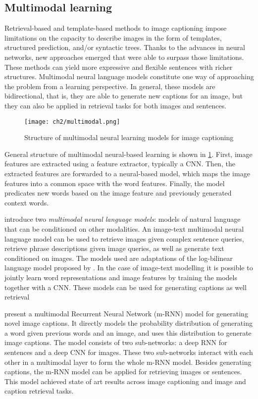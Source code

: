 \subsection{Multimodal learning}

Retrieval-based and template-based methods to image captioning impose limitations on the capacity to describe images in the form of templates, structured prediction, and/or syntactic trees. Thanks to the advances in neural networks, new approaches emerged that were able to surpass those limitations. These methods can yield more expressive and flexible sentences with richer structures.  Multimodal neural language models constitute one way of approaching the problem from a learning perspective. In general, these models are bidirectional, that is, they are able to generate new captions for an image, but they can also be applied in retrieval tasks for both images and sentences.

\begin{figure}[hpt]
	\centering
	\texttt{[image: ch2/multimodal.png]}
	\caption{Structure of multimodal neural learning models for image captioning}
	\label{fig:multimodal}
\end{figure}

General structure of multimodal neural-based learning is shown in \ref{fig:multimodal}. First, image features are extracted using a feature extractor, typically a CNN. Then, the extracted features are forwarded to a neural-based model, which maps the image features into a common space with the word features. Finally, the model predicates new words based on the image feature and previously generated context words.

\citet{Kiros2014a} introduce two \textit{multimodal neural language models}: models of natural language that can be conditioned on other modalities. An image-text multimodal neural language model can be used to retrieve images given complex sentence queries, retrieve phrase descriptions given image queries, as well as generate text conditioned on images. The models used are adaptations of the log-bilinear language model proposed by \citep{Mnih2007}. In the case of image-text modelling it is possible to jointly learn word representations and image features by training the models together with a CNN. These models can be used for generating captions as well retrieval

\citet{Mao2014, Mao2015a} present a multimodal Recurrent Neural Network (m-RNN) model for generating novel image captions. It directly models the probability distribution of generating a word given previous words and an image, and uses this distribution to generate image captions. The model consists of two sub-networks: a deep RNN for sentences and a deep CNN for images. These two sub-networks interact with each other in a multimodal layer to form the whole m-RNN model. Besides generating captions, the m-RNN model can be applied for retrieving images or sentences. This model achieved state of art results across image captioning and image and caption retrieval tasks.

